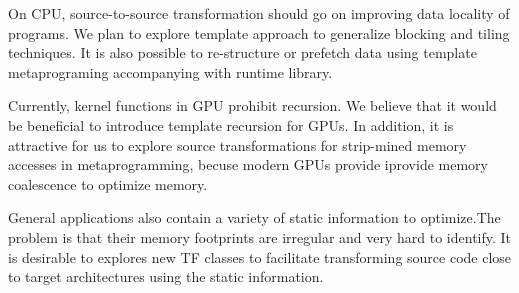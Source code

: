 On CPU, source-to-source transformation should go on improving data
locality of programs. We plan to explore template approach to  generalize
blocking and tiling techniques.  It is also possible to re-structure
or prefetch data using template metaprograming accompanying with
runtime library.

Currently, kernel functions in GPU prohibit recursion. We believe that
it would be beneficial to introduce template recursion for
GPUs. In addition, it is attractive for us to explore source transformations for
strip-mined memory accesses in metaprogramming, becuse modern GPUs provide iprovide memory
coalescence to optimize memory.


General applications also contain a variety of static information to
optimize.The problem is that their memory footprints are irregular and
very hard to identify. It is desirable to explores new TF classes to facilitate
transforming source code close to target architectures using the static
information.
